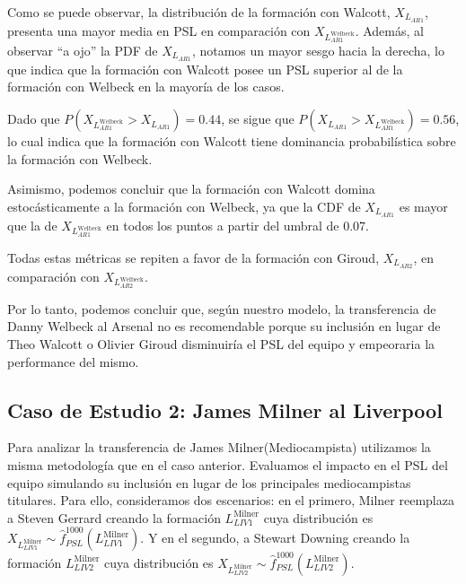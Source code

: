 \documentclass[
  a4paper,
]{article}
\begin{document}
Como se puede observar, la distribución de la formación con Walcott,
\(X_{L_{AR1}}\), presenta una mayor media en PSL en comparación con
\(X_{L_{AR1}^{\text{Welbeck}}}\). Además, al observar ``a ojo'' la PDF
de \(X_{L_{AR1}}\), notamos un mayor sesgo hacia la derecha, lo que
indica que la formación con Walcott posee un PSL superior al de la
formación con Welbeck en la mayoría de los casos.

Dado que \(P(X_{L_{AR1}^{\text{Welbeck}}} > X_{L_{AR1}}) = 0.44\), se
sigue que \(P(X_{L_{AR1}} > X_{L_{AR1}^{\text{Welbeck}}}) = 0.56\), lo
cual indica que la formación con Walcott tiene dominancia probabilística
sobre la formación con Welbeck.

Asimismo, podemos concluir que la formación con Walcott domina
estocásticamente a la formación con Welbeck, ya que la CDF de
\(X_{L_{AR1}}\) es mayor que la de \(X_{L_{AR1}^{\text{Welbeck}}}\) en
todos los puntos a partir del umbral de 0.07.

Todas estas métricas se repiten a favor de la formación con Giroud,
\(X_{L_{AR2}}\), en comparación con \(X_{L_{AR2}^{\text{Welbeck}}}\).

Por lo tanto, podemos concluir que, según nuestro modelo, la
transferencia de Danny Welbeck al Arsenal no es recomendable porque su
inclusión en lugar de Theo Walcott o Olivier Giroud disminuiría el PSL
del equipo y empeoraria la performance del mismo.

\newpage

\hypertarget{caso-de-estudio-2-james-milner-al-liverpool}{%
\subsection{Caso de Estudio 2: James Milner al
Liverpool}\label{caso-de-estudio-2-james-milner-al-liverpool}}

Para analizar la transferencia de James Milner(Mediocampista) utilizamos
la misma metodología que en el caso anterior. Evaluamos el impacto en el
PSL del equipo simulando su inclusión en lugar de los principales
mediocampistas titulares. Para ello, consideramos dos escenarios: en el
primero, Milner reemplaza a Steven Gerrard creando la formación
\(L_{LIV1}^{\text{Milner}}\) cuya distribución es
\(X_{L_{LIV1}^{\text{Milner}}} \sim \hat{f}^{1000}_{PSL}(L_{LIV1}^{\text{Milner}})\).
Y en el segundo, a Stewart Downing creando la formación
\(L_{LIV2}^{\text{Milner}}\) cuya distribución es
\(X_{L_{LIV2}^{\text{Milner}}} \sim \hat{f}^{1000}_{PSL}(L_{LIV2}^{\text{Milner}})\).
\end{document}
